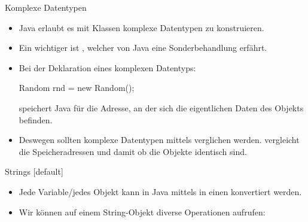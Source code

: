 \begin{frame}[fragile]{Komplexe Datentypen}
    \begin{itemize}[<+(1)->]
        \widei
        \item Java erlaubt es mit Klassen komplexe Datentypen zu konstruieren.
        \item Ein wichtiger ist ,\pause{} welcher von Java eine Sonderbehandlung erfährt.
        \item Bei der Deklaration eines komplexen Datentyps:\pause{}
\begin{plainjava}
Random rnd = new Random();
\end{plainjava}
        \pause{}speichert Java für  die Adresse,\pause{} an der sich die eigentlichen Daten des Objekts befinden.
        \item Deswegen sollten komplexe Datentypen mittels  verglichen werden.\pause{} \bjava{==} vergleicht die Speicheradressen\pause{} und damit ob die Objekte identisch sind.
    \end{itemize}
\end{frame}

\begin{frame}{Strings}
    [default]%
    \begin{itemize}[<+(1)->]
        \widei
        \item Jede Variable/jedes Objekt kann in Java mittels  in einen  konvertiert werden.
        \item Wir können auf einem String-Objekt diverse Operationen aufrufen: 
    \end{itemize}
\end{frame}


